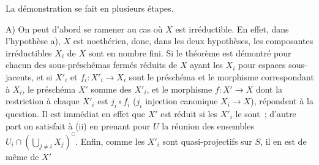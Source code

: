 La démonstration se fait en plusieurs étapes.

A) On peut d'abord se ramener au cas où $X$ est irréductible. En effet, dans
l'hypothèse a), $X$ est noethérien, donc, dans les deux hypothèses, les
composantes irréductibles $X_i$ de $X$ sont en nombre fini. Si le théorème est
démontré pour chacun des sous-préschémas fermés réduits de $X$ ayant les $X_i$
pour espaces sous-jacents, et si $X'_i$ et $f_i:X'_i\to X_i$ sont le préschéma
et le morphisme correspondant à $X_i$, le préschéma $X'$ somme des $X'_i$, et
le morphisme $f:X'\to X$ dont la restriction à chaque $X'_i$ est $j_i\circ f_i$
($j_i$ injection canonique $X_i\to X$), répondent à la question. Il est
immédiat en effet que $X'$ est réduit si les $X'_i$ le sont~; d'autre part on
satisfait à (ii) en prenant pour $U$ la réunion des ensembles
$U_i\cap(\bigcup_{j\neq i}X_j)^{\complement}$. Enfin, comme les $X'_i$ sont
quasi-projectifs sur $S$, il en est de même de $X'$

